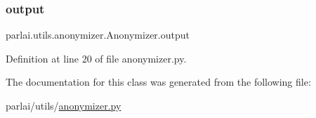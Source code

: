 \subsubsection{\texorpdfstring{output}{output}}
{\footnotesize\ttfamily parlai.\+utils.\+anonymizer.\+Anonymizer.\+output}



Definition at line 20 of file anonymizer.\+py.



The documentation for this class was generated from the following file\+:\begin{DoxyCompactItemize}
\item 
parlai/utils/\hyperlink{anonymizer_8py}{anonymizer.\+py}\end{DoxyCompactItemize}
